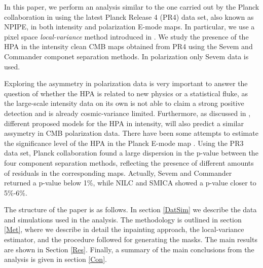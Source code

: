 In this paper, we perform an analysis similar to the one carried out by the Planck collaboration in \cite{Planck:2019evm} using the latest Planck Release 4 (PR4) data set, also known as NPIPE, in both intensity and polarization E-mode maps. In particular, we use a pixel space \emph{local-variance} method introduced in \cite{Akrami:2014eta}. We study the presence of the HPA in the intensity clean CMB maps 
obtained from PR4 using the Sevem \cite{2012MNRAS.420.2162F} and Commander \cite{2008ApJ...676...10E} componet separation methods. In polarization only Sevem data is used.

Exploring the asymmetry in polarization data is very important to answer the question of whether the HPA is related to new physics or a statistical fluke, as the large-scale intensity data on its own is not able to claim a strong positive detection and is already cosmic-variance limited. Furthermore, as discussed in \cite{2020MNRAS.492.3994G}, different proposed models for the HPA in intensity, will also predict a similar assymetry in CMB polarization data.
There have been some attempts to estimate the significance level of the HPA in the Planck E-mode map \cite{2017arXiv171000580A, 2020MNRAS.492.3994G, Planck:2019evm}. Using the PR3 data set, Planck collaboration found a large dispersion in the p-value between the four component separation methods, reflecting the presence of different amounts of residuals in the corresponding maps. Actually, Sevem and Commander returned a p-value below 1\%, while NILC and SMICA showed a p-value closer to 5\%-6\%.

The structure of the paper is as follows. In section \ref{DatSim} we describe the data and simulations used in the analysis. The methodology is outlined in section \ref{Met}, where we describe in detail the inpainting approach, the local-variance estimator, and the procedure followed for generating the masks. The main results are shown in Section \ref{Res}. Finally, a summary of the main conclusions from the analysis is given in section \ref{Con}.
